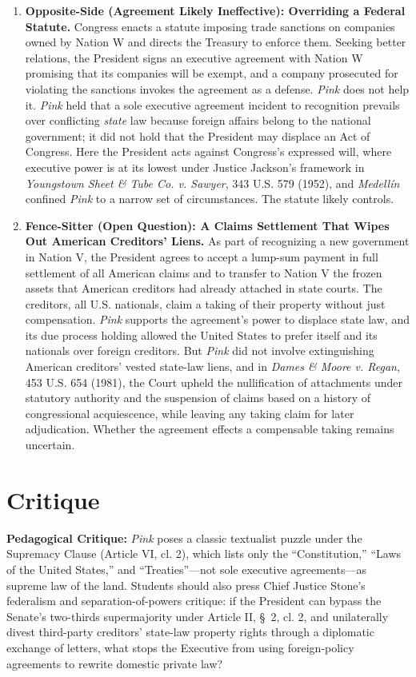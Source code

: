 \documentclass[12pt]{article}
\begin{document}
\begin{enumerate}
\item \textbf{Opposite-Side (Agreement Likely Ineffective): Overriding a Federal Statute.} Congress enacts a statute imposing trade sanctions on companies owned by Nation W and directs the Treasury to enforce them. Seeking better relations, the President signs an executive agreement with Nation W promising that its companies will be exempt, and a company prosecuted for violating the sanctions invokes the agreement as a defense. \textit{Pink} does not help it. \textit{Pink} held that a sole executive agreement incident to recognition prevails over conflicting \textit{state} law because foreign affairs belong to the national government; it did not hold that the President may displace an Act of Congress. Here the President acts against Congress's expressed will, where executive power is at its lowest under Justice Jackson's framework in \textit{Youngstown Sheet \& Tube Co. v. Sawyer}, 343 U.S. 579 (1952), and \textit{Medell\'in} confined \textit{Pink} to a narrow set of circumstances. The statute likely controls.

\item \textbf{Fence-Sitter (Open Question): A Claims Settlement That Wipes Out American Creditors' Liens.} As part of recognizing a new government in Nation V, the President agrees to accept a lump-sum payment in full settlement of all American claims and to transfer to Nation V the frozen assets that American creditors had already attached in state courts. The creditors, all U.S. nationals, claim a taking of their property without just compensation. \textit{Pink} supports the agreement's power to displace state law, and its due process holding allowed the United States to prefer itself and its nationals over foreign creditors. But \textit{Pink} did not involve extinguishing American creditors' vested state-law liens, and in \textit{Dames \& Moore v. Regan}, 453 U.S. 654 (1981), the Court upheld the nullification of attachments under statutory authority and the suspension of claims based on a history of congressional acquiescence, while leaving any taking claim for later adjudication. Whether the agreement effects a compensable taking remains uncertain.

\end{enumerate}

\section{Critique}
\textbf{Pedagogical Critique:} \textit{Pink} poses a classic textualist puzzle under the Supremacy Clause (Article VI, cl. 2), which lists only the ``Constitution,'' ``Laws of the United States,'' and ``Treaties''---not sole executive agreements---as supreme law of the land. Students should also press Chief Justice Stone's federalism and separation-of-powers critique: if the President can bypass the Senate's two-thirds supermajority under Article II, \S~2, cl. 2, and unilaterally divest third-party creditors' state-law property rights through a diplomatic exchange of letters, what stops the Executive from using foreign-policy agreements to rewrite domestic private law?
\end{document}
